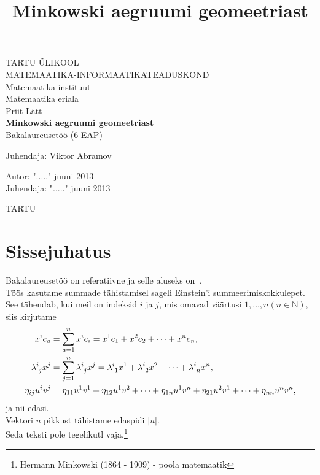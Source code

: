 \documentclass[a4paper,12pt]{article}
\title{Minkowski aegruumi geomeetriast}
\theoremstyle{plain}
\theoremstyle{definition}
\numberwithin{equation}{section}
\begin{document}
\begin{titlepage}
\begin{center}

{\large TARTU ÜLIKOOL}\\[0.3cm]
{\large MATEMAATIKA-INFORMAATIKATEADUSKOND}\\[0.3cm]
{\large Matemaatika instituut}\\[0.3cm]
{\large Matemaatika eriala}\\[3cm]

{\large Priit Lätt}\\[0.3cm]
{\huge \textbf{Minkowski aegruumi geomeetriast}}\\[0.3cm]
{\large Bakalaureusetöö (6 EAP)}\\[3cm]

\begin{flushright}
{\large Juhendaja: Viktor Abramov}
\end{flushright}

\vfill

\begin{flushleft}
{\large
Autor: \dotfill "....." juuni 2013\\
Juhendaja: \dotfill "....." juuni 2013\\[2cm]
}
\end{flushleft}
{\large TARTU \the\year}

\end{center}
\end{titlepage}

\tableofcontents
\newpage

\section{Sissejuhatus}

Bakalaureusetöö on referatiivne ja selle aluseks on~\cite{Naber}. \\
Töös kasutame summade tähistamisel sageli Einstein'i summeerimiskokkulepet. See tähendab, kui meil on indeksid $i$ ja $j$, mis omavad väärtusi $1, \dots, n \left( n \in \mathbb{N} \right)$, siis kirjutame 
\begin{align*}
x^{i} e_{a} &= \sum_{a=1}^{n} x^{i} e_{i} = x^{1} e_{1} + x^{2} e_{2} + \dots + x^{n} e_{n}, \\
\lambda\indices{^i_j} x^{j} &= \sum_{j=1}^{n} \lambda\indices{^i_j} x^{j} = \lambda\indices{^i_1} x^{1} + \lambda\indices{^i_2} x^{2} + \dots +\lambda\indices{^i_n} x^{n},\\
\eta_{ij} u^{i} v^{j} &= \eta_{11} u^{1} v^{1} + \eta_{12} u^{1} v^{2} + \dots + \eta_{1n} u^{1} v^{n} + \eta_{21} u^{2} v^{1} + \dots + \eta_{nn} u^{n} v^{n},
\end{align*}
ja nii edasi.\\
Vektori $u$ pikkust tähistame edaspidi $|u|$. \\
Seda teksti pole tegelikutl vaja.\footnote{Hermann Minkowski (1864 - 1909) - poola matemaatik}
\end{document}
